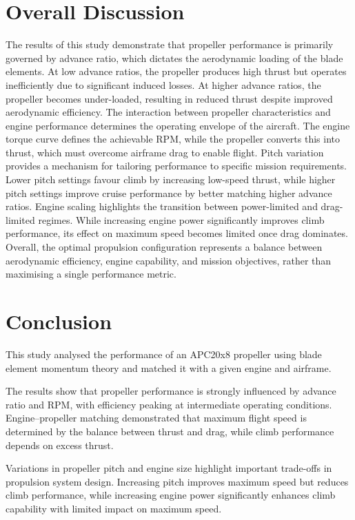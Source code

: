 \documentclass[a4paper,12pt]{article} %
\begin{document}
\section{Overall Discussion}
The results of this study demonstrate that propeller performance is primarily governed by 
advance ratio, which dictates the aerodynamic loading of the blade elements. At low advance 
ratios, the propeller produces high thrust but operates inefficiently due to significant 
induced losses. At higher advance ratios, the propeller becomes under-loaded, resulting in 
reduced thrust despite improved aerodynamic efficiency. The interaction between propeller characteristics and engine performance determines the 
operating envelope of the aircraft. The engine torque curve defines the achievable RPM, 
while the propeller converts this into thrust, which must overcome airframe drag to enable 
flight. Pitch variation provides a mechanism for tailoring performance to specific mission 
requirements. Lower pitch settings favour climb by increasing low-speed thrust, while 
higher pitch settings improve cruise performance by better matching higher advance ratios. Engine scaling highlights the transition between power-limited and drag-limited regimes. 
While increasing engine power significantly improves climb performance, its effect on 
maximum speed becomes limited once drag dominates. Overall, the optimal propulsion configuration represents a balance between aerodynamic 
efficiency, engine capability, and mission objectives, rather than maximising a single 
performance metric.

\section{Conclusion}

This study analysed the performance of an APC20x8 propeller using blade element momentum theory and matched it with a given engine and airframe.

The results show that propeller performance is strongly influenced by advance ratio and RPM, with efficiency peaking at intermediate operating conditions. Engine–propeller matching demonstrated that maximum flight speed is determined by the balance between thrust and drag, while climb performance depends on excess thrust.

Variations in propeller pitch and engine size highlight important trade-offs in propulsion system design. Increasing pitch improves maximum speed but reduces climb performance, while increasing engine power significantly enhances climb capability with limited impact on maximum speed.
\end{document}
